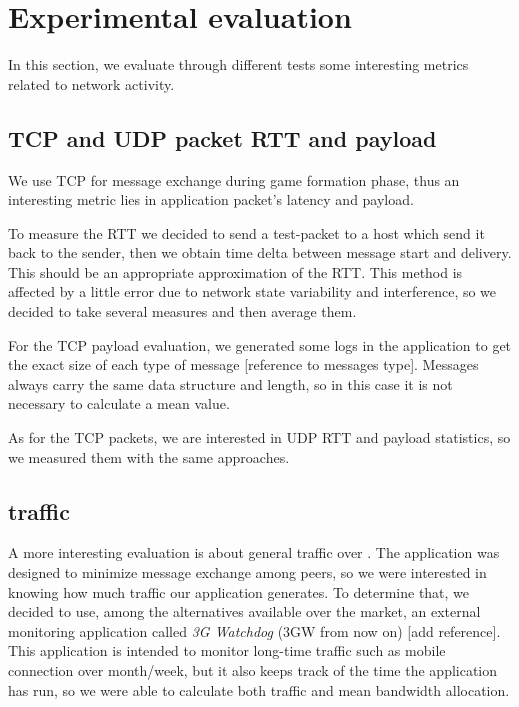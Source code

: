 \section{Experimental evaluation}

In this section, we evaluate through different tests some interesting metrics related to network activity.

\subsection{TCP and UDP packet RTT and payload}

We use TCP for message exchange during game formation phase, thus an interesting metric lies in application packet's latency and payload.
 
To measure the RTT we decided to send a test-packet to a host which send it back to the sender, then we obtain time delta between message start and delivery. This should be an appropriate approximation of the RTT. This method is affected by a little error due to network state variability and interference, so we decided to take several measures and then average them.

For the TCP payload evaluation, we generated some logs in the application to get the exact size of each type of message [reference to messages type]. Messages always carry the same data structure and length, so in this case it is not necessary to calculate a mean value.

As for the TCP packets, we are interested in UDP RTT and payload statistics, so we measured them with the same approaches.

\subsection{\wifi{} traffic}

A more interesting evaluation is about general traffic over \wifi. The application was designed to minimize message exchange among peers, so we were interested in knowing how much traffic our application generates. To determine that, we decided to use, among the alternatives available over the market, an external monitoring application called \textit{3G Watchdog} (3GW from now on) [add reference]. This application is intended to monitor long-time traffic such as mobile connection over month/week, but it also keeps track of the time the application has run, so we were able to calculate both traffic and mean bandwidth allocation.

